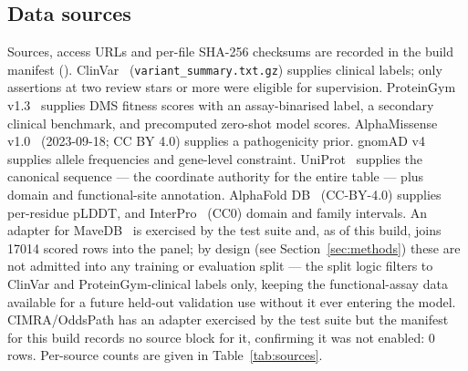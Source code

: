 \documentclass{bioinfo}
\begin{document}
\subsection{Data sources}

Sources, access URLs and per-file SHA-256 checksums are recorded in the build
manifest (). ClinVar~\cite{landrum2018clinvar}
(\texttt{variant\_summary.txt.gz}) supplies clinical labels; only assertions at
two review stars or more were eligible for supervision. ProteinGym v1.3~\cite{notin2023proteingym}
supplies DMS fitness scores with an assay-binarised label, a secondary clinical
benchmark, and precomputed zero-shot model scores. AlphaMissense v1.0~\cite{cheng2023alphamissense}
(2023-09-18; CC BY 4.0) supplies a pathogenicity prior. gnomAD v4~\cite{chen2024gnomad,karczewski2020gnomad} supplies
allele frequencies and gene-level constraint. UniProt~\cite{uniprot} supplies the canonical
sequence --- the coordinate authority for the entire table --- plus domain and
functional-site annotation. AlphaFold DB~\cite{varadi2022afdb,jumper2021alphafold} (CC-BY-4.0) supplies per-residue
pLDDT, and InterPro~\cite{interpro} (CC0) domain and family intervals. An adapter for
MaveDB~\cite{esposito2019mavedb} is exercised by the test suite and, as of this build,
joins \num{17014} scored rows into the panel; by design (see
Section~\ref{sec:methods}) these are not admitted into any training or evaluation
split --- the split logic filters to ClinVar and ProteinGym-clinical labels only,
keeping the functional-assay data available for a future held-out validation use
without it ever entering the model. CIMRA/OddsPath has an adapter exercised by the
test suite but the manifest for this build records no source block for it, confirming
it was not enabled: 0 rows. Per-source counts are given in Table~\ref{tab:sources}.
\end{document}
